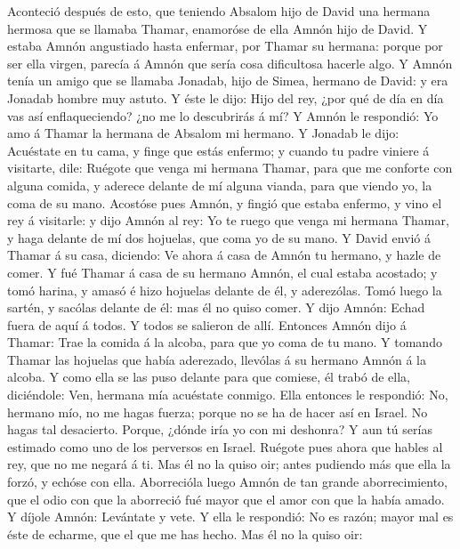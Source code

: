  Aconteció después de esto, que teniendo Absalom hijo de
David una hermana hermosa que se llamaba Thamar, enamoróse de ella Amnón
hijo de David.  Y estaba Amnón angustiado hasta enfermar,
por Thamar su hermana: porque por ser ella virgen, parecía á Amnón que
sería cosa dificultosa hacerle algo.  Y Amnón tenía un amigo
que se llamaba Jonadab, hijo de Simea, hermano de David: y era Jonadab
hombre muy astuto.  Y éste le dijo: Hijo del rey, ¿por qué
de día en día vas así enflaqueciendo? ¿no me lo descubrirás á mí? Y
Amnón le respondió: Yo amo á Thamar la hermana de Absalom mi hermano.
 Y Jonadab le dijo: Acuéstate en tu cama, y finge que estás
enfermo; y cuando tu padre viniere á visitarte, dile: Ruégote que venga
mi hermana Thamar, para que me conforte con alguna comida, y aderece
delante de mí alguna vianda, para que viendo yo, la coma de su mano.
 Acostóse pues Amnón, y fingió que estaba enfermo, y vino el
rey á visitarle: y dijo Amnón al rey: Yo te ruego que venga mi hermana
Thamar, y haga delante de mí dos hojuelas, que coma yo de su mano.
 Y David envió á Thamar á su casa, diciendo: Ve ahora á casa
de Amnón tu hermano, y hazle de comer.  Y fué Thamar á casa
de su hermano Amnón, el cual estaba acostado; y tomó harina, y amasó é
hizo hojuelas delante de él, y aderezólas.  Tomó luego la
sartén, y sacólas delante de él: mas él no quiso comer. Y dijo Amnón:
Echad fuera de aquí á todos. Y todos se salieron de allí. 
Entonces Amnón dijo á Thamar: Trae la comida á la alcoba, para que yo
coma de tu mano. Y tomando Thamar las hojuelas que había aderezado,
llevólas á su hermano Amnón á la alcoba.  Y como ella se
las puso delante para que comiese, él trabó de ella, diciéndole: Ven,
hermana mía acuéstate conmigo.  Ella entonces le respondió:
No, hermano mío, no me hagas fuerza; porque no se ha de hacer así en
Israel. No hagas tal desacierto.  Porque, ¿dónde iría yo
con mi deshonra? Y aun tú serías estimado como uno de los perversos en
Israel. Ruégote pues ahora que hables al rey, que no me negará á ti.
 Mas él no la quiso oir; antes pudiendo más que ella la
forzó, y echóse con ella.  Aborrecióla luego Amnón de tan
grande aborrecimiento, que el odio con que la aborreció fué mayor que el
amor con que la había amado. Y díjole Amnón: Levántate y vete.
 Y ella le respondió: No es razón; mayor mal es éste de
echarme, que el que me has hecho. Mas él no la quiso oir: 
